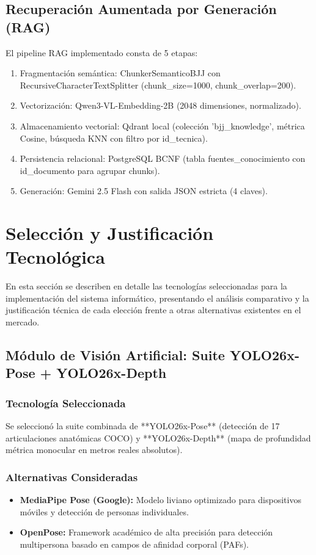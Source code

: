 \subsection{Recuperación Aumentada por Generación (RAG)}
El pipeline RAG implementado consta de 5 etapas:
\begin{enumerate}
    \item Fragmentación semántica: ChunkerSemanticoBJJ con RecursiveCharacterTextSplitter (chunk\_size=1000, chunk\_overlap=200).
    \item Vectorización: Qwen3-VL-Embedding-2B (2048 dimensiones, normalizado).
    \item Almacenamiento vectorial: Qdrant local (colección 'bjj\_knowledge', métrica Cosine, búsqueda KNN con filtro por id\_tecnica).
    \item Persistencia relacional: PostgreSQL BCNF (tabla fuentes\_conocimiento con id\_documento para agrupar chunks).
    \item Generación: Gemini 2.5 Flash con salida JSON estricta (4 claves).
\end{enumerate}

\newpage

\section{Selección y Justificación Tecnológica}

En esta sección se describen en detalle las tecnologías seleccionadas para la implementación del sistema informático, presentando el análisis comparativo y la justificación técnica de cada elección frente a otras alternativas existentes en el mercado.

\subsection{Módulo de Visión Artificial: Suite YOLO26x-Pose + YOLO26x-Depth}

\subsubsection{Tecnología Seleccionada}
Se seleccionó la suite combinada de **YOLO26x-Pose** (detección de 17 articulaciones anatómicas COCO) y **YOLO26x-Depth** (mapa de profundidad métrica monocular en metros reales absolutos).

\subsubsection{Alternativas Consideradas}
\begin{itemize}
    \item \textbf{MediaPipe Pose (Google):} Modelo liviano optimizado para dispositivos móviles y detección de personas individuales.
    \item \textbf{OpenPose:} Framework académico de alta precisión para detección multipersona basado en campos de afinidad corporal (PAFs).
\end{itemize}

